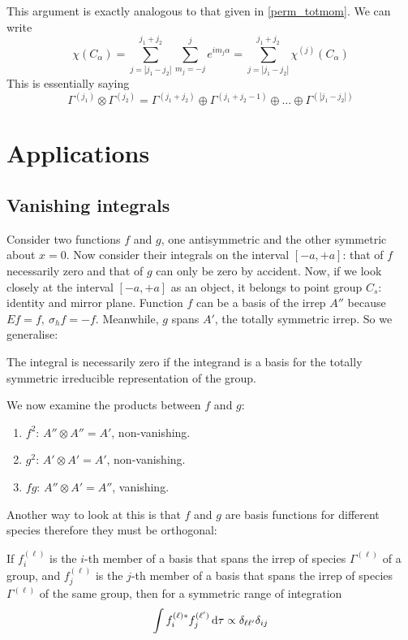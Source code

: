  This argument is exactly analogous to that given in \cref{perm_totmom}. We can write 
\begin{equation}
	\chi(C_{\alpha})=\sum_{j=|j_1-j_2|}^{j_1+j_2}\sum_{m_j=-j}^je^{im_j\alpha}=\sum_{j=|j_1-j_2|}^{j_1+j_2}\chi^{(j)}(C_{\alpha})
\end{equation}
This is essentially saying
\begin{equation}
	\Gamma^{(j_1)}\otimes\Gamma^{(j_2)}=\Gamma^{(j_1+j_2)}\oplus\Gamma^{(j_1+j_2-1)}\oplus\dots\oplus\Gamma^{(|j_1-j_2|)}
\end{equation}

\section{Applications}
\subsection{Vanishing integrals}
Consider two functions $f$ and $g$, one antisymmetric and the other symmetric 
about $x=0$. Now consider their integrals on the interval $[-a,+a]$: that of $f$ 
necessarily zero and that of $g$ can only be zero by accident. Now, if we look 
closely at the interval $[-a,+a]$ as an object, it belongs to point group $C_s$: 
identity and mirror plane. Function $f$ can be a basis of the irrep $A''$ because 
$Ef=f,\ \sigma_hf=-f$. Meanwhile, $g$ spans $A'$, the totally symmetric irrep. 
So we generalise:
\begin{lemma}
The integral is necessarily zero if the integrand is a basis for the totally 
symmetric irreducible representation of the group. 
\end{lemma}
We now examine the products between $f$ and $g$:
\begin{enumerate}
	\item $f^2$: $A''\otimes A''=A'$, non-vanishing.
	\item $g^2$: $A'\otimes A'=A'$, non-vanishing.
	\item $fg$: $A''\otimes A'=A''$, vanishing. 
\end{enumerate}
Another way to look at this is that $f$ and $g$ are basis functions for different 
species therefore they must be orthogonal:
\begin{lemma}
If $f_i^{(\ell)}$ is the $i$-th member of a basis that spans the irrep of species 
$\Gamma^{(\ell)}$ of a group, and $f_j^{(\ell)}$ is the $j$-th member of a basis 
that spans the irrep of species $\Gamma^{(\ell)}$ of the same group, then for 
a symmetric range of integration
\begin{equation}
\int f_i^{(\ell)*}f_j^{(\ell')}\dif\tau\propto\delta_{\ell\ell'}\delta_{ij}
\end{equation}
\end{lemma}
